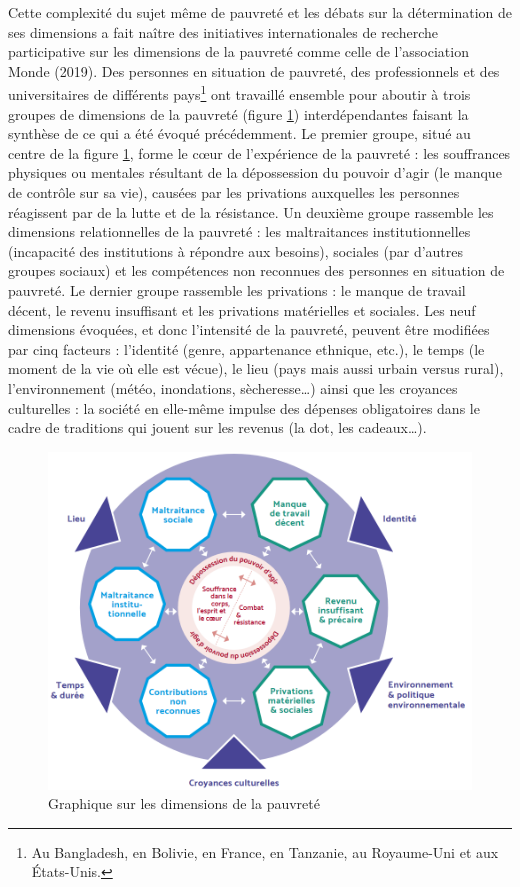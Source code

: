 \documentclass[12pt,a4paper]{reedthesis}
\begin{document}
Cette complexité du sujet même de pauvreté et les débats sur la détermination de ses dimensions a fait naître des initiatives internationales de recherche participative sur les dimensions de la pauvreté comme celle de l'association Monde (2019). Des personnes en situation de pauvreté, des professionnels et des universitaires de différents pays\footnote{Au Bangladesh, en Bolivie, en France, en Tanzanie, au Royaume-Uni et aux États-Unis.} ont travaillé ensemble pour aboutir à trois groupes de dimensions de la pauvreté (figure \ref{fig:figatd}) interdépendantes faisant la synthèse de ce qui a été évoqué précédemment. Le premier groupe, situé au centre de la figure \ref{fig:figatd}, forme le cœur de l'expérience de la pauvreté : les souffrances physiques ou mentales résultant de la dépossession du pouvoir d'agir (le manque de contrôle sur sa vie), causées par les privations auxquelles les personnes réagissent par de la lutte et de la résistance. Un deuxième groupe rassemble les dimensions relationnelles de la pauvreté : les maltraitances institutionnelles (incapacité des institutions à répondre aux besoins), sociales (par d'autres groupes sociaux) et les compétences non reconnues des personnes en situation de pauvreté. Le dernier groupe rassemble les privations : le manque de travail décent, le revenu insuffisant et les privations matérielles et sociales. Les neuf dimensions évoquées, et donc l'intensité de la pauvreté, peuvent être modifiées par cinq facteurs : l'identité (genre, appartenance ethnique, etc.), le temps (le moment de la vie où elle est vécue), le lieu (pays mais aussi urbain versus rural), l'environnement (météo, inondations, sècheresse\ldots) ainsi que les croyances culturelles : la société en elle-même impulse des dépenses obligatoires dans le cadre de traditions qui jouent sur les revenus (la dot, les cadeaux\ldots).
\begin{figure}

{\centering \includegraphics[width=0.8\linewidth]{figures/fig_atd} 

}

\caption{Graphique sur les dimensions de la pauvreté}\label{fig:figatd}
\end{figure}
\end{document}

